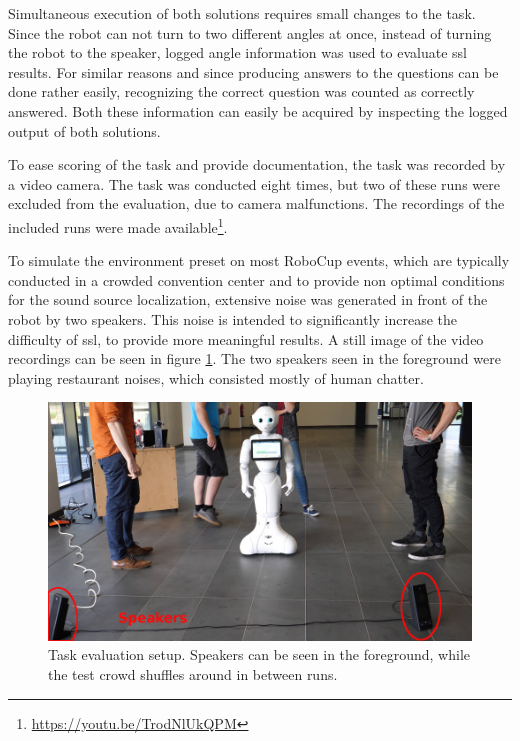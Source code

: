 Simultaneous execution of both solutions requires small changes to the task.
Since the robot can not turn to two different angles at once, instead of turning the robot to the speaker, logged angle information was used to evaluate \gls{ssl} results.
For similar reasons and since producing answers to the questions can be done rather easily, recognizing the correct question was counted as correctly answered.
Both these information can easily be acquired by inspecting the logged output of both solutions.

To ease scoring of the task and provide documentation, the task was recorded by a video camera.
The task was conducted eight times, but two of these runs were excluded from the evaluation, due to camera malfunctions.
The recordings of the included runs were made available\footnote{\url{https://youtu.be/TrodNlUkQPM}}.

To simulate the environment preset on most RoboCup events, which are typically conducted in a crowded convention center and to provide non optimal conditions for the sound source localization, extensive noise was generated in front of the robot by two speakers.
This noise is intended to significantly increase the difficulty of \gls{ssl}, to provide more meaningful results.
A still image of the video recordings can be seen in figure \ref{pic:eval_task_setup_pepper}.
The two speakers seen in the foreground were playing restaurant noises, which consisted mostly of human chatter.

\begin{figure}[]
	\centering
	\includegraphics[width=\textwidth]{bilder/eval/pepper_task_setup_small.jpg}
	\caption{Task evaluation setup. 
		Speakers can be seen in the foreground, while the test crowd shuffles around in between runs.}
	\label{pic:eval_task_setup_pepper}
\end{figure}

